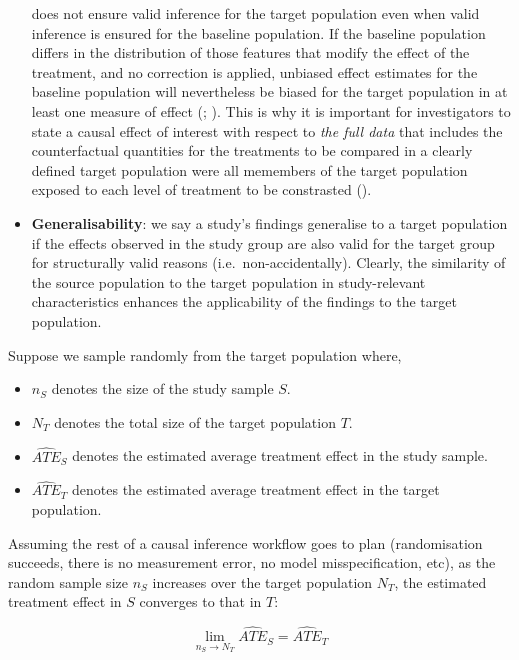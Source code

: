 \documentclass[
  single column]{article}
\providecommand{\tightlist}{%
  \setlength{\itemsep}{0pt}\setlength{\parskip}{0pt}}\usepackage{longtable,booktabs,array}
\begin{document}
\begin{itemize}
  does not ensure valid inference for the target population even when
  valid inference is ensured for the baseline population. If the
  baseline population differs in the distribution of those features that
  modify the effect of the treatment, and no correction is applied,
  unbiased effect estimates for the baseline population will
  nevertheless be biased for the target population in at least one
  measure of effect (; ). This is why
  it is important for investigators to state a causal effect of interest
  with respect to \emph{the full data} that includes the counterfactual
  quantities for the treatments to be compared in a clearly defined
  target population were all memembers of the target population exposed
  to each level of treatment to be constrasted
  ().
\item
  \textbf{Generalisability}: we say a study's findings generalise to a
  target population if the effects observed in the study group are also
  valid for the target group for structurally valid reasons
  (i.e.~non-accidentally). Clearly, the similarity of the source
  population to the target population in study-relevant characteristics
  enhances the applicability of the findings to the target population.
\end{itemize}

Suppose we sample randomly from the target population where,

\begin{itemize}
\tightlist
\item
  \(n_S\) denotes the size of the study sample \(S\).
\item
  \(N_T\) denotes the total size of the target population \(T\).
\item
  \(\hat{ATE}_{S}\) denotes the estimated average treatment effect in
  the study sample.
\item
  \(\hat{ATE}_{T}\) denotes the estimated average treatment effect in
  the target population.
\end{itemize}

Assuming the rest of a causal inference workflow goes to plan
(randomisation succeeds, there is no measurement error, no model
misspecification, etc), as the random sample size \(n_S\) increases over
the target population \(N_T\), the estimated treatment effect in \(S\)
converges to that in \(T\):

\[
\lim_{n_S \to N_T} \hat{ATE}_{S} = \hat{ATE}_{T}
\]
\end{document}
